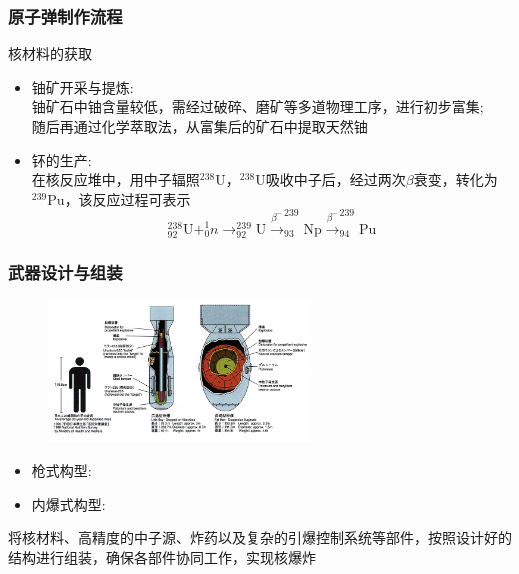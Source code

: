 \begin{frame}
    \frametitle{原子弹制作流程}
核材料的获取
    \begin{itemize}
        \item 铀矿开采与提炼:\\
		铀矿石中铀含量较低，需经过破碎、磨矿等多道物理工序，进行初步富集;\\
		随后再通过化学萃取法，从富集后的矿石中提取天然铀\\
			{\fontsize{7.2pt}{6.2pt}}
        \item 钚的生产:\\
		在核反应堆中，用中子辐照$^{238}\mathrm{U}$，$^{238}\mathrm{U}$吸收中子后，经过两次$\beta$衰变，转化为$^{239}\mathrm{Pu}$，该反应过程可表示
		\begin{displaymath}
			^{238}_{92}\mathrm{U} + ^{1}_{0}n \rightarrow ^{239}_{92}\mathrm{U} \xrightarrow{\beta^-} ^{239}_{93}\mathrm{Np} \xrightarrow{\beta^-} ^{239}_{94}\mathrm{Pu}
		\end{displaymath}
    \end{itemize}

\end{frame}

\begin{frame}
    \frametitle{武器设计与组装}
    \vskip -0.4cm
    \begin{figure}
        \includegraphics[width=0.62\textwidth]{Figures_History/Structure.jpg}
    \end{figure}
    \begin{itemize}
        \item 枪式构型:~\\
		{\fontsize{7.2pt}{6.2pt}\selectfont{把两块处于次临界状态的核材料，通过炸药爆炸产生的推力，使其迅速碰撞合并，达到超临界状态，进而引发链式反应。该方式核材料利用率低，现已较少使用}}
        \item 内爆式构型:~\\
		{\fontsize{7.2pt}{6.2pt}\selectfont{将核材料置于中心，周围包裹炸药。炸药起爆后，产生向心的冲击波，将核材料迅速压缩，使其达到超临界状态，引发链式反应。是较为经典的武器设计}}
    \end{itemize}
        将核材料、高精度的中子源、炸药以及复杂的引爆控制系统等部件，按照设计好的结构进行组装，确保各部件协同工作，实现核爆炸
\end{frame}

